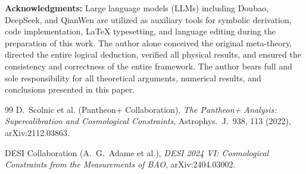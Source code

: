 \documentclass[10pt,a4paper,twocolumn]{article}
\begin{document}
\vspace{1em}
\textbf{Acknowledgments:} Large language models (LLMs) including Doubao, DeepSeek, and QianWen are utilized as auxiliary tools for symbolic derivation, code implementation, LaTeX typesetting, and language editing during the preparation of this work. The author alone conceived the original meta-theory, directed the entire logical deduction, verified all physical results, and ensured the consistency and correctness of the entire framework. The author bears full and sole responsibility for all theoretical arguments, numerical results, and conclusions presented in this paper.
\begin{thebibliography}{99}
D.~Scolnic et al. (Pantheon+ Collaboration),
\emph{The Pantheon+ Analysis: Supercalibration and Cosmological Constraints},
Astrophys.~J.~938, 113 (2022), arXiv:2112.03863.

DESI Collaboration (A.~G.~Adame et al.),
\emph{DESI 2024 VI: Cosmological Constraints from the Measurements of BAO},
arXiv:2404.03002.
\end{thebibliography}
\end{document}
